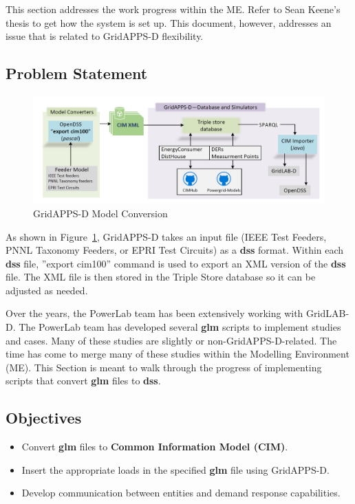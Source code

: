 This section addresses the work progress within the ME. Refer to Sean Keene's thesis to get how the system is set up. This document, however, addresses an issue that is related to GridAPPS-D flexibility. 

\subsection{Problem Statement}

\begin{figure}[htp!]
    \centering
    \includegraphics[width=0.7\columnwidth]{Pictures/model_conversion.png}
    \caption{GridAPPS-D Model Conversion}
    \label{fig:me_gridappsd}
\end{figure}

As shown in Figure~\ref{fig:me_gridappsd}, GridAPPS-D takes an input file (IEEE Test Feeders, PNNL Taxonomy Feeders, or EPRI Test Circuits) as a \textbf{dss} format. Within each \textbf{dss} file,
''export cim100'' command is used to export an XML version of the \textbf{dss} file. The XML file is then stored in the Triple Store database so it can be adjusted as needed. 


Over the years, the PowerLab team has been extensively working with GridLAB-D. The PowerLab team has developed several \textbf{glm} scripts to implement studies and cases. Many of these studies are slightly or non-GridAPPS-D-related. 
The time has come to merge many of these studies within the Modelling Environment (ME). This Section is meant to walk through the progress of implementing scripts that convert \textbf{glm} files to \textbf{dss}.

\subsection{Objectives}
\begin{itemize}
    \item Convert \textbf{glm} files to \textbf{Common Information Model (CIM)}.
    \item Insert the appropriate loads in the specified \textbf{glm} file using GridAPPS-D.
    \item Develop communication between entities and demand response capabilities.
\end{itemize}


